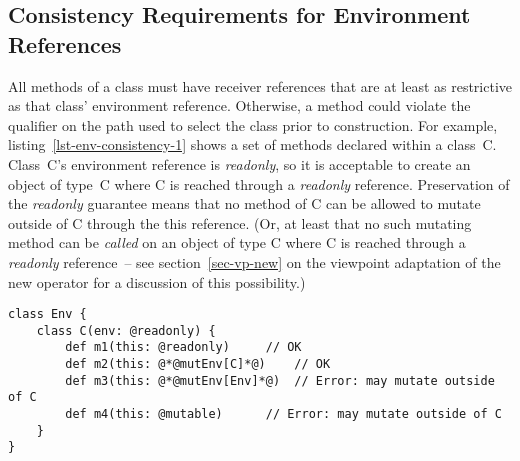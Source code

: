 \begin{comment}
\begin{lstlisting}[caption={Covariance of Environment References},float={htp},label={lst-env-covariance}]
class Env {
	class Function1[-S,+T](env:@*@mutEnv[Env]@*) {
		def apply(this:@*@mutEnv[Env]*@, s: S): T
	}
	class Function1D[-S,+T](env:@readonly) extends Function1 {  // Error: @readonly fails covariance test
		def apply(this:@mutEnv[Env], s: S): T   // Error: @mutEnv[Env] fails consistency test
	}
	class Function1E[-S,+T](env:@mutable) extends Function1 {
		def apply(this:@mutable, s: S): T       // Error: override fails contravariant-parameter test
		def apply(this:@*@mutEnv[Env]*@, s: S): T
		def apply(this:@readonly, s: S): T
	}
}
\end{lstlisting}
\end{comment}


\subsection{Consistency Requirements for Environment References} \label{sec-env-consistency}

All methods of a class must have receiver references that are at least as restrictive
as that class' environment reference.
Otherwise, a method could violate the qualifier on the path used to select the
class prior to construction.
For example, listing~\ref{lst-env-consistency-1} shows a set of methods declared within
a class~{\cd C}. Class~{\cd C}'s environment reference is {\em readonly},
so it is acceptable to create an object of type~{\cd C} where {\cd C} is
reached through a {\em readonly} reference.
Preservation of the {\em readonly} guarantee means that no method of {\cd C}
can be allowed to mutate outside of {\cd C} through the {\cd this} reference.
(Or, at least that no such mutating method can be {\em called} on an object of type {\cd C}
where {\cd C} is reached through a {\em readonly} reference~-- see section~\ref{sec-vp-new}
on the viewpoint adaptation of the {\cd new} operator for a discussion of this possibility.)

\begin{lstlisting}[caption={Environment Reference Consistency (1)},float={htp},label={lst-env-consistency-1}]
class Env {
	class C(env: @readonly) {
		def m1(this: @readonly)     // OK
		def m2(this: @*@mutEnv[C]*@)    // OK
		def m3(this: @*@mutEnv[Env]*@)  // Error: may mutate outside of C
		def m4(this: @mutable)      // Error: may mutate outside of C
	}
}
\end{lstlisting}

